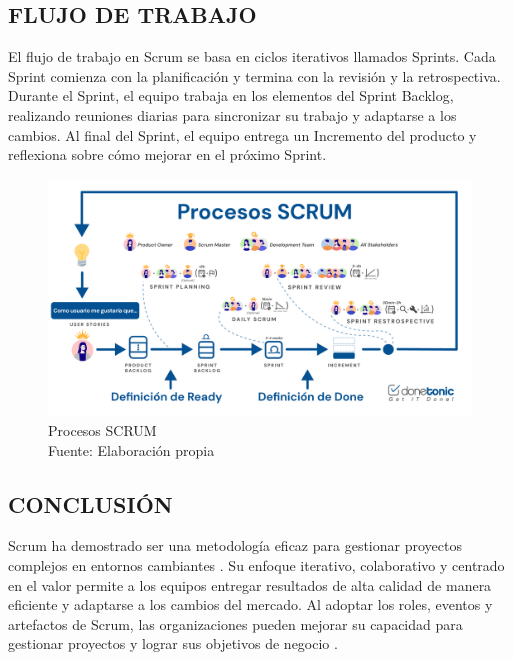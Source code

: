 \subsection{FLUJO DE TRABAJO}

El flujo de trabajo en Scrum se basa en ciclos iterativos llamados Sprints. Cada Sprint comienza con la planificación y termina con la revisión y la retrospectiva. Durante el Sprint, el equipo trabaja en los elementos del Sprint Backlog, realizando reuniones diarias para sincronizar su trabajo y adaptarse a los cambios. Al final del Sprint, el equipo entrega un Incremento del producto y reflexiona sobre cómo mejorar en el próximo Sprint.

\begin{figure}[H]
    \centering
    \includegraphics[scale=0.24]{imagenes/Procesos-SCRUM.png}
    \caption{Procesos SCRUM\\ Fuente: Elaboración propia}
\end{figure}

\subsection{CONCLUSIÓN}

Scrum ha demostrado ser una metodología eficaz para gestionar proyectos complejos en entornos cambiantes \autocite{sutherland2014scrum}. Su enfoque iterativo, colaborativo y centrado en el valor permite a los equipos entregar resultados de alta calidad de manera eficiente y adaptarse a los cambios del mercado. Al adoptar los roles, eventos y artefactos de Scrum, las organizaciones pueden mejorar su capacidad para gestionar proyectos y lograr sus objetivos de negocio \autocite{cohn2010suceeding}.
